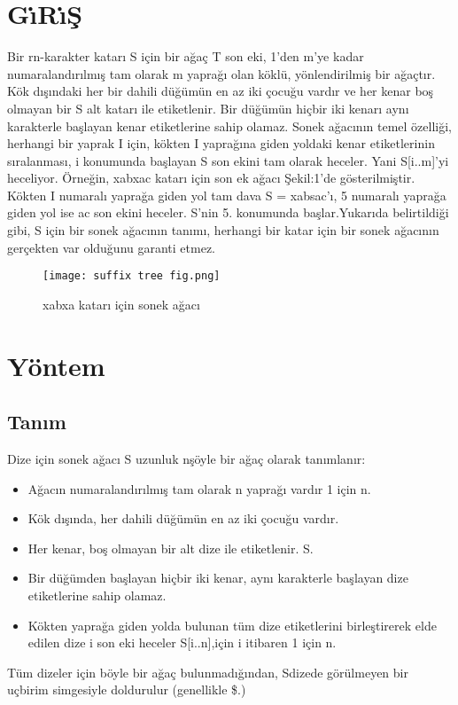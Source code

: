 \documentclass[conference]{IEEEtran}
\begin{document}
\section*{\textbf{\LARGE G\.{ı}R\.{ı}Ş}}
Bir rn-karakter katarı S için bir ağaç Τ son eki, 1'den m'ye kadar numaralandırılmış tam olarak m yaprağı olan köklü, yönlendirilmiş bir ağaçtır. Kök dışındaki her bir dahili düğümün en az iki çocuğu vardır ve her kenar boş olmayan bir S alt katarı ile etiketlenir. Bir düğümün hiçbir iki kenarı aynı karakterle başlayan kenar etiketlerine sahip olamaz. Sonek ağacının temel özelliği, herhangi bir yaprak I için,
kökten I yaprağına giden yoldaki kenar etiketlerinin sıralanması, i konumunda başlayan S son ekini tam olarak heceler. Yani S[i..m]'yi heceliyor. Örneğin, xabxac katarı için son ek ağacı Şekil:1'de gösterilmiştir. Kökten I numaralı yaprağa giden yol tam dava S = xabsac'ı, 5 numaralı yaprağa giden yol ise ac son ekini heceler. S'nin 5. konumunda başlar.Yukarıda belirtildiği gibi, S için bir sonek ağacının tanımı, herhangi bir katar için bir sonek ağacının gerçekten var olduğunu garanti etmez.


\begin{figure}[h]
    \centering
    \texttt{[image: suffix tree fig.png]}
    \caption{xabxa katarı için sonek ağacı}
    \label{Şekil:1}
\end{figure}



\section*{\textbf{\LARGE Yöntem}}

\subsection{\textbf{\Large Tanım}}\label{SCM}
Dize için sonek ağacı S uzunluk nşöyle bir ağaç olarak tanımlanır: 

\begin{itemize}
\item Ağacın numaralandırılmış tam olarak n yaprağı vardır 1 için n.

\item Kök dışında, her dahili düğümün en az iki çocuğu vardır.

\item Her kenar, boş olmayan bir alt dize ile etiketlenir. S.

\item Bir düğümden başlayan hiçbir iki kenar, aynı karakterle başlayan dize etiketlerine sahip olamaz.

\item Kökten yaprağa giden yolda bulunan tüm dize etiketlerini birleştirerek elde edilen dize i son eki heceler S[i..n],için i itibaren 1 için n.

\end{itemize}
Tüm dizeler için böyle bir ağaç bulunmadığından, Sdizede görülmeyen bir uçbirim simgesiyle doldurulur (genellikle \$.)\\
\end{document}
